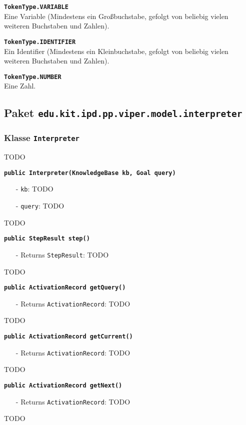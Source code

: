 \documentclass[parskip=full,11pt,twoside]{scrartcl}
\begin{document}
\textbf{\texttt{TokenType.VARIABLE}}\\
Eine Variable (Mindestens ein Großbuchstabe, gefolgt von beliebig vielen weiteren Buchstaben und Zahlen).

\textbf{\texttt{TokenType.IDENTIFIER}}\\
Ein Identifier (Mindestens ein Kleinbuchstabe, gefolgt von beliebig vielen weiteren Buchstaben und Zahlen).

\textbf{\texttt{TokenType.NUMBER}}\\
Eine Zahl.

\newpage
\subsection{Paket \texttt{edu.kit.ipd.pp.viper.model.interpreter}}

\subsubsection{Klasse \texttt{Interpreter}}
TODO

\textbf{\texttt{public Interpreter(KnowledgeBase kb, Goal query)}}
\begin{itemize}[noitemsep]
	\item[-] \texttt{kb}: TODO
	\item[-] \texttt{query}: TODO
\end{itemize}
TODO

\textbf{\texttt{public StepResult step()}}
\begin{itemize}[noitemsep]
	\item[-] Returns \texttt{StepResult}: TODO
\end{itemize}
TODO

\textbf{\texttt{public ActivationRecord getQuery()}}
\begin{itemize}[noitemsep]
	\item[-] Returns \texttt{ActivationRecord}: TODO
\end{itemize}
TODO

\textbf{\texttt{public ActivationRecord getCurrent()}}
\begin{itemize}[noitemsep]
	\item[-] Returns \texttt{ActivationRecord}: TODO
\end{itemize}
TODO

\textbf{\texttt{public ActivationRecord getNext()}}
\begin{itemize}[noitemsep]
	\item[-] Returns \texttt{ActivationRecord}: TODO
\end{itemize}
TODO
\end{document}
